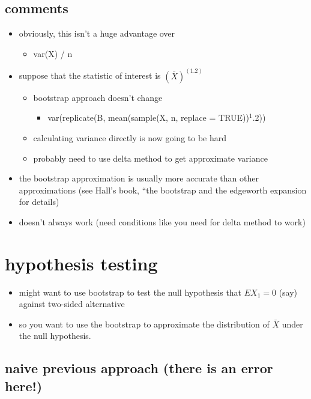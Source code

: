\subsection{comments}
\label{sec-1-3}

\begin{itemize}
\item obviously, this isn't a huge advantage over
\begin{itemize}
\item var(X) / n
\end{itemize}
\item suppose that the statistic of interest is $(\bar X)^(1.2)$
\begin{itemize}
\item bootstrap approach doesn't change
\begin{itemize}
\item var(replicate(B, mean(sample(X, n, replace = TRUE))$^1$.2))
\end{itemize}
\item calculating variance directly is now going to be hard
\item probably need to use delta method to get approximate variance
\end{itemize}
\item the bootstrap approximation is usually more accurate than
       other approximations (see Hall's book, ``the bootstrap and the
       edgeworth expansion for details)
\item doesn't always work (need conditions like you need for delta
       method to work)
\end{itemize}
\section{hypothesis testing}
\label{sec-2}

\begin{itemize}
\item might want to use bootstrap to test the null hypothesis that 
      $E X_1 = 0$ (say) against two-sided alternative
\item so you want to use the bootstrap to approximate the distribution
      of $\bar X$ under the null hypothesis.
\end{itemize}
\subsection{naive previous approach (there is an error here!)}
\label{sec-2-1}

